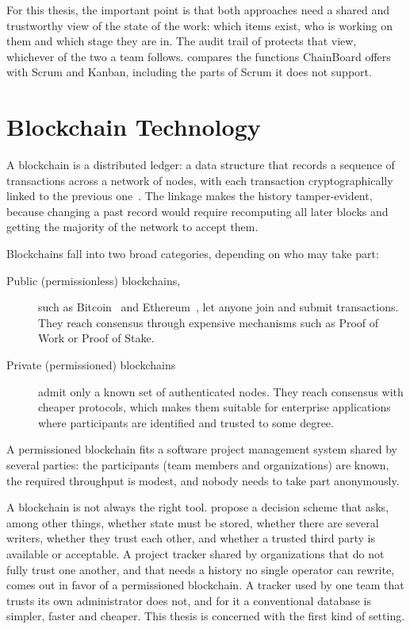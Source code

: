 For this thesis, the important point is that both approaches need a shared and trustworthy view of the state of the work: which items exist, who is working on them and which stage they are in. The audit trail of  protects that view, whichever of the two a team follows.  compares the functions ChainBoard offers with Scrum and Kanban, including the parts of Scrum it does not support.

\section{Blockchain Technology}
\label{sec:blockchain}

A blockchain is a distributed ledger: a data structure that records a sequence of transactions across a network of nodes, with each transaction cryptographically linked to the previous one~\cite{nakamoto2008bitcoin}. The linkage makes the history tamper-evident, because changing a past record would require recomputing all later blocks and getting the majority of the network to accept them.

Blockchains fall into two broad categories, depending on who may take part:

\begin{description}
    \item[Public (permissionless) blockchains,] such as Bitcoin~\cite{nakamoto2008bitcoin} and Ethereum~\cite{ethereum}, let anyone join and submit transactions. They reach consensus through expensive mechanisms such as Proof of Work or Proof of Stake.
    \item[Private (permissioned) blockchains] admit only a known set of authenticated nodes. They reach consensus with cheaper protocols, which makes them suitable for enterprise applications where participants are identified and trusted to some degree.
\end{description}

A permissioned blockchain fits a software project management system shared by several parties: the participants (team members and organizations) are known, the required throughput is modest, and nobody needs to take part anonymously.

A blockchain is not always the right tool. \textcite{wust2018need} propose a decision scheme that asks, among other things, whether state must be stored, whether there are several writers, whether they trust each other, and whether a trusted third party is available or acceptable. A project tracker shared by organizations that do not fully trust one another, and that needs a history no single operator can rewrite, comes out in favor of a permissioned blockchain. A tracker used by one team that trusts its own administrator does not, and for it a conventional database is simpler, faster and cheaper. This thesis is concerned with the first kind of setting.

